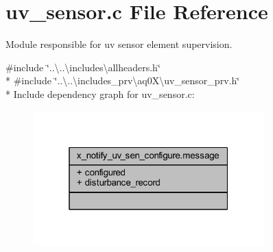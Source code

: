 \hypertarget{a00073}{\section{uv\+\_\+sensor.\+c File Reference}
\label{a00073}
}


Module responsible for uv sensor element supervision.  


{\ttfamily \#include \char`\"{}..\textbackslash{}..\textbackslash{}includes\textbackslash{}allheaders.\+h\char`\"{}}\\*
{\ttfamily \#include \char`\"{}..\textbackslash{}..\textbackslash{}includes\+\_\+prv\textbackslash{}aq0\+X\textbackslash{}uv\+\_\+sensor\+\_\+prv.\+h\char`\"{}}\\*
Include dependency graph for uv\+\_\+sensor.\+c\+:\nopagebreak
\begin{figure}[H]
\begin{center}
\leavevmode
\includegraphics[width=253pt]{d6/d9a/a01710}
\end{center}
\end{figure}
